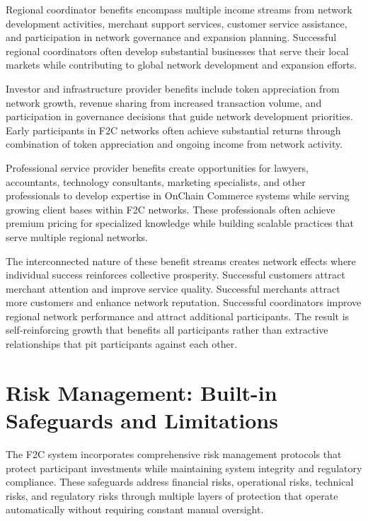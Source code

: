 \documentclass[
  Letterpaper,
]{scrbook}
\begin{document}
Regional coordinator benefits encompass multiple income streams from
network development activities, merchant support services, customer
service assistance, and participation in network governance and
expansion planning. Successful regional coordinators often develop
substantial businesses that serve their local markets while contributing
to global network development and expansion efforts.

Investor and infrastructure provider benefits include token appreciation
from network growth, revenue sharing from increased transaction volume,
and participation in governance decisions that guide network development
priorities. Early participants in F2C networks often achieve substantial
returns through combination of token appreciation and ongoing income
from network activity.

Professional service provider benefits create opportunities for lawyers,
accountants, technology consultants, marketing specialists, and other
professionals to develop expertise in OnChain Commerce systems while
serving growing client bases within F2C networks. These professionals
often achieve premium pricing for specialized knowledge while building
scalable practices that serve multiple regional networks.

The interconnected nature of these benefit streams creates network
effects where individual success reinforces collective prosperity.
Successful customers attract merchant attention and improve service
quality. Successful merchants attract more customers and enhance network
reputation. Successful coordinators improve regional network performance
and attract additional participants. The result is self-reinforcing
growth that benefits all participants rather than extractive
relationships that pit participants against each other.

\section{Risk Management: Built-in Safeguards and
Limitations}\label{risk-management-built-in-safeguards-and-limitations}

The F2C system incorporates comprehensive risk management protocols that
protect participant investments while maintaining system integrity and
regulatory compliance. These safeguards address financial risks,
operational risks, technical risks, and regulatory risks through
multiple layers of protection that operate automatically without
requiring constant manual oversight.
\end{document}

